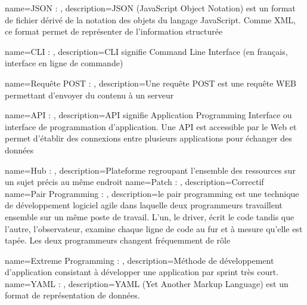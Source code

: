 {
    name=JSON : ,
    description={JSON (JavaScript Object Notation) est un format de fichier dérivé de la notation des objets du langage JavaScript. Comme XML, ce format permet de représenter de l’information structurée}
}

{
    name=CLI : ,
    description={CLI signifie Command Line Interface (en français, interface en ligne de commande)}
}

{
    name=Requête POST : ,
    description={Une requête POST est une requête WEB permettant d'envoyer du contenu à un serveur}
}

{
    name=API : ,
    description={API signifie Application Programming Interface ou interface de programmation d’application. Une API est accessible par le Web et permet d’établir des connexions entre plusieurs applications pour échanger des données}
}

{
    name=Hub : ,
    description={Plateforme regroupant l’ensemble des ressources sur un sujet précis au même endroit}
}
{
    name=Patch : ,
    description={Correctif}
}
{
    name=Pair Programming : ,
    description={le pair programming est une technique de développement logiciel agile dans laquelle deux programmeurs travaillent ensemble sur un même poste de travail. L’un, le driver, écrit le code tandis que l’autre, l’observateur, examine chaque ligne de code au fur et à mesure qu’elle est tapée. Les deux programmeurs changent fréquemment de rôle}
}

{
    name=Extreme Programming : ,
    description={Méthode de développement d'application consistant à développer une application par sprint très court.}
}
{
    name=YAML : ,
    description={YAML (Yet Another Markup Language) est un format de représentation de données.}
}
